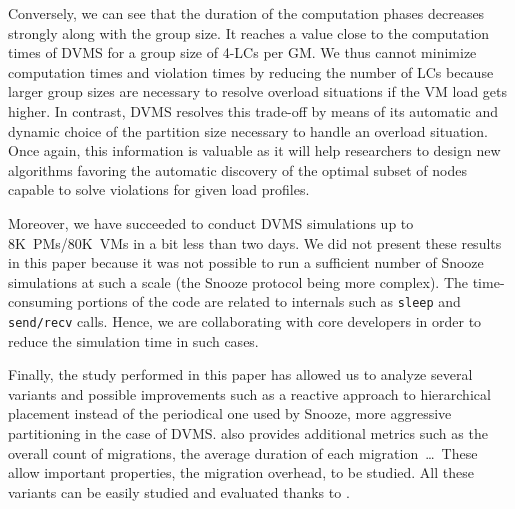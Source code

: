 Conversely, we can see that the duration of the computation phases
decreases strongly along with the group size. It reaches a value close
to the computation times of DVMS for a group size of 4-LCs per
GM.%
We thus cannot minimize computation times and violation times by
reducing the number of LCs because larger group sizes are necessary to
resolve overload situations if the VM load gets higher.  In contrast,
DVMS resolves this trade-off by means of its automatic and dynamic
choice of the partition size necessary to handle an overload
situation.  Once again, this information is valuable as it will help
researchers to design new algorithms favoring the automatic discovery
of the optimal subset of nodes capable to solve violations for given
load profiles.


Moreover, we have succeeded to conduct DVMS simulations up to
8K~PMs/80K~VMs in a bit less than two days. We did not present these
results in this paper because it was not possible to run a sufficient
number of Snooze simulations at such a scale (the Snooze protocol
being more
complex).
The time-consuming portions of the code are related to \sg internals
such as \texttt{sleep} and \texttt{send/recv} calls. Hence, we are
collaborating with \sg core developers in order to reduce the
simulation time in such cases.

Finally, the study performed in this paper has allowed us to analyze
several variants and possible improvements such as a reactive approach
to hierarchical placement instead of the periodical one used by
Snooze, more aggressive partitioning in the case of DVMS.  \vmps also
provides additional metrics such as the overall count of migrations,
the average duration of each migration~\ldots\ These allow important
properties, \eg the migration overhead, to be studied. All these
variants can be easily studied and evaluated thanks to \vmps.



